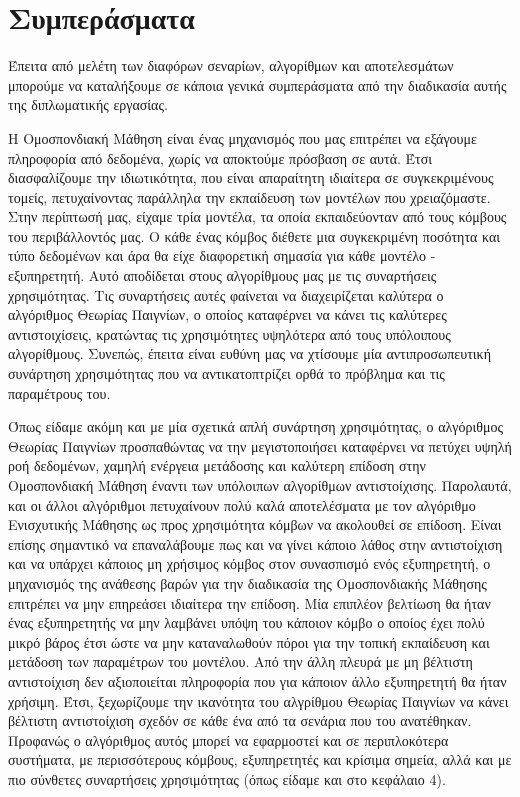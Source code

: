 \chapter{Συμπεράσματα}

Έπειτα από μελέτη των διαφόρων σεναρίων, αλγορίθμων και αποτελεσμάτων μπορούμε να καταλήξουμε σε κάποια γενικά συμπεράσματα από την διαδικασία αυτής της διπλωματικής εργασίας.

Η Ομοσπονδιακή Μάθηση είναι ένας μηχανισμός που μας επιτρέπει να εξάγουμε πληροφορία από δεδομένα, χωρίς να αποκτούμε πρόσβαση σε αυτά. Έτσι διασφαλίζουμε την ιδιωτικότητα, που είναι απαραίτητη ιδιαίτερα σε συγκεκριμένους τομείς, πετυχαίνοντας παράλληλα την εκπαίδευση των μοντέλων που χρειαζόμαστε. Στην περίπτωσή μας, είχαμε τρία μοντέλα, τα οποία εκπαιδεύονταν από τους κόμβους του περιβάλλοντός μας. Ο κάθε ένας κόμβος διέθετε μια συγκεκριμένη ποσότητα και τύπο δεδομένων και άρα θα είχε διαφορετική σημασία για κάθε μοντέλο - εξυπηρετητή. Αυτό αποδίδεται στους αλγορίθμους μας με τις συναρτήσεις χρησιμότητας. Τις συναρτήσεις αυτές φαίνεται να διαχειρίζεται καλύτερα ο αλγόριθμος Θεωρίας Παιγνίων, ο οποίος καταφέρνει να κάνει τις καλύτερες αντιστοιχίσεις, κρατώντας τις χρησιμότητες υψηλότερα από τους υπόλοιπους αλγορίθμους. Συνεπώς, έπειτα είναι ευθύνη μας να χτίσουμε μία αντιπροσωπευτική συνάρτηση χρησιμότητας που να αντικατοπτρίζει ορθά το πρόβλημα και τις παραμέτρους του. 

Όπως είδαμε ακόμη και με μία σχετικά απλή συνάρτηση χρησιμότητας, ο αλγόριθμος Θεωρίας Παιγνίων προσπαθώντας να την μεγιστοποιήσει καταφέρνει να πετύχει υψηλή ροή δεδομένων, χαμηλή ενέργεια μετάδοσης και καλύτερη επίδοση στην Ομοσπονδιακή Μάθηση έναντι των υπόλοιπων αλγορίθμων αντιστοίχισης. Παρολαυτά, και οι άλλοι αλγόριθμοι πετυχαίνουν πολύ καλά αποτελέσματα με τον αλγόριθμο Ενισχυτικής Μάθησης ως προς χρησιμότητα κόμβων να ακολουθεί σε επίδοση. Είναι επίσης σημαντικό να επαναλάβουμε πως και να γίνει κάποιο λάθος στην αντιστοίχιση και να υπάρχει κάποιος μη χρήσιμος κόμβος στον συνασπισμό ενός εξυπηρετητή, ο μηχανισμός της ανάθεσης βαρών για την διαδικασία της Ομοσπονδιακής Μάθησης επιτρέπει να μην επηρεάσει ιδιαίτερα την επίδοση. Μία επιπλέον βελτίωση θα ήταν ένας εξυπηρετητής να μην λαμβάνει υπόψη του κάποιον κόμβο ο οποίος έχει πολύ μικρό βάρος έτσι ώστε να μην καταναλωθούν πόροι για την τοπική εκπαίδευση και μετάδοση των παραμέτρων του μοντέλου. Από την άλλη πλευρά με μη βέλτιστη αντιστοίχιση δεν αξιοποιείται πληροφορία που για κάποιον άλλο εξυπηρετητή θα ήταν χρήσιμη. Έτσι, ξεχωρίζουμε την ικανότητα του αλγρίθμου Θεωρίας Παιγνίων να κάνει βέλτιστη αντιστοίχιση σχεδόν σε κάθε ένα από τα σενάρια που του ανατέθηκαν. Προφανώς ο αλγόριθμος αυτός μπορεί να εφαρμοστεί και σε περιπλοκότερα συστήματα, με περισσότερους κόμβους, εξυπηρετητές και κρίσιμα σημεία, αλλά και με πιο σύνθετες συναρτήσεις χρησιμότητας (όπως είδαμε και στο κεφάλαιο 4).

